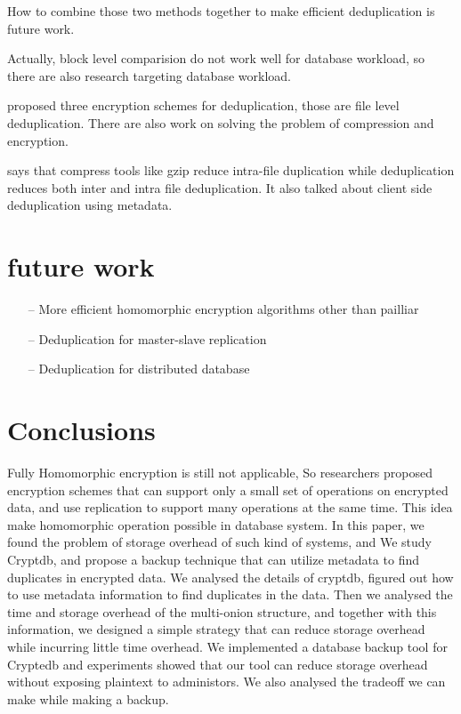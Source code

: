 How to combine those two methods together to make efficient deduplication is future work.

Actually, block level comparision do not work well for database workload, so there are also research targeting database workload. 

\citep{francinasurvey} proposed three encryption schemes for deduplication, those are file level deduplication.
There are also work on solving the problem of compression and encryption\citep{zheng2017minicrypt}.

\citep{mandagere2008demystifying} says that compress tools like gzip reduce intra-file duplication while deduplication reduces both inter and intra file deduplication. It also talked about client side deduplication using metadata.



\section{future work}

\begin{itemize}
\item[--] More efficient homomorphic encryption algorithms other than pailliar
\item[--] Deduplication for master-slave replication
\item[--] Deduplication for distributed database
\end{itemize}



\section{Conclusions}

Fully Homomorphic encryption is still not applicable, So researchers proposed encryption schemes that can support only a small set of operations on encrypted data, and use replication to support many operations at the same time. This idea make homomorphic operation possible in database system. In this paper, we found the problem of storage overhead of such kind of systems, and We study Cryptdb, and propose a backup technique that can utilize metadata to find duplicates in encrypted data. We analysed the details of cryptdb, figured out how to use metadata information to find duplicates in the data. Then we analysed the time and storage overhead of the multi-onion structure, and together with this information, we designed a simple strategy that can reduce storage overhead while incurring little time overhead. We implemented a database backup tool for Cryptedb and experiments showed that our tool can reduce storage overhead without exposing plaintext to administors. We also analysed the tradeoff we can make while making a backup.

